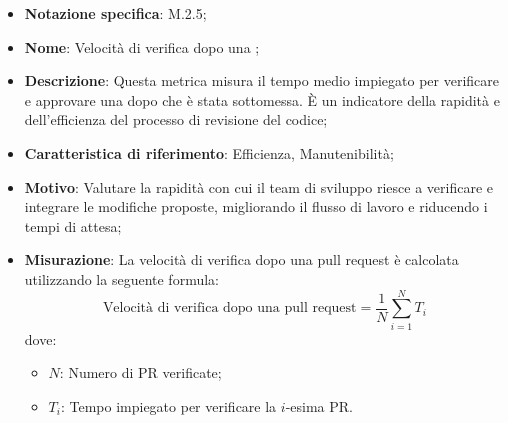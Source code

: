 \begin{itemize}
    \item \textbf{Notazione specifica}: M.2.5;
    \item \textbf{Nome}: Velocità di verifica dopo una ;
    \item \textbf{Descrizione}: Questa metrica misura il tempo medio impiegato per verificare e approvare una  dopo che è stata sottomessa. È un indicatore della rapidità e dell'efficienza del processo di revisione del codice;
    \item \textbf{Caratteristica di riferimento}: Efficienza, Manutenibilità;
    \item \textbf{Motivo}: Valutare la rapidità con cui il team di sviluppo riesce a verificare e integrare le modifiche proposte, migliorando il flusso di lavoro e riducendo i tempi di attesa;
    \item \textbf{Misurazione}: La velocità di verifica dopo una pull request è calcolata utilizzando la seguente formula:
    \[
        \text{Velocità di verifica dopo una pull request} =\frac{1}{N} \sum_{i=1}^{N} T_i 
    \]
    dove:
    \begin{itemize}
        \item $N$: Numero di PR verificate;
        \item $T_{i}$: Tempo impiegato per verificare la \(i\)-esima PR.
    \end{itemize}
\end{itemize}
